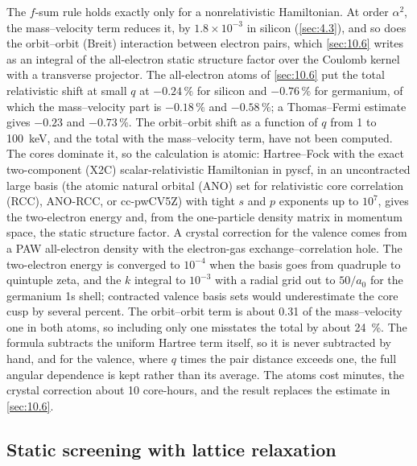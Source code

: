 The $f$-sum rule holds exactly only for a nonrelativistic Hamiltonian. At order $\alpha^2$, the mass--velocity term reduces it, by $1.8\times10^{-3}$ in silicon (\cref{sec:4.3}), and so does the orbit--orbit (Breit) interaction between electron pairs, which \cref{sec:10.6} writes as an integral of the all-electron static structure factor over the Coulomb kernel with a transverse projector. The all-electron atoms of \cref{sec:10.6} put the total relativistic shift at small $q$ at $-0.24\,\%$ for silicon and $-0.76\,\%$ for germanium, of which the mass--velocity part is $-0.18\,\%$ and $-0.58\,\%$; a Thomas--Fermi estimate gives $-0.23$ and $-0.73\,\%$. The orbit--orbit shift as a function of $q$ from 1 to \SI{100}{keV}, and the total with the mass--velocity term, have not been computed. The cores dominate it, so the calculation is atomic: Hartree--Fock with the exact two-component (X2C) scalar-relativistic Hamiltonian in pyscf, in an uncontracted large basis (the atomic natural orbital (ANO) set for relativistic core correlation (RCC), ANO-RCC, or cc-pwCV5Z) with tight $s$ and $p$ exponents up to $10^7$, gives the two-electron energy and, from the one-particle density matrix in momentum space, the static structure factor. A crystal correction for the valence comes from a PAW all-electron density with the electron-gas exchange--correlation hole. The two-electron energy is converged to $10^{-4}$ when the basis goes from quadruple to quintuple zeta, and the $k$ integral to $10^{-3}$ with a radial grid out to $50/a_0$ for the germanium 1s shell; contracted valence basis sets would underestimate the core cusp by several percent. The orbit--orbit term is about 0.31 of the mass--velocity one in both atoms, so including only one misstates the total by about \SI{24}{\percent}. The formula subtracts the uniform Hartree term itself, so it is never subtracted by hand, and for the valence, where $q$ times the pair distance exceeds one, the full angular dependence is kept rather than its average. The atoms cost minutes, the crystal correction about 10 core-hours, and the result replaces the estimate in \cref{sec:10.6}.

\subsection{Static screening with lattice relaxation}

